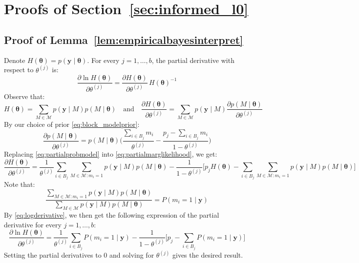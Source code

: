 \documentclass[aos]{imsart}
\theoremstyle{plain}
\newcommand{\M}{\mathcal{M}}
\newcommand{\bs}{\boldsymbol}
\begin{document}
\section{Proofs of Section~\ref{sec:informed_l0}}

\subsection{Proof of Lemma~\ref{lem:empiricalbayesinterpret}}
Denote $H(\bs \theta)=p(\bs y \mid \bs \theta)$. For every $j=1,\ldots,b$, the partial derivative with respect to $\theta^{(j)}$ is:
    \begin{equation}\label{eq:logderivative}
        \frac{\partial \ln H(\bs \theta)}{\partial \theta^{(j)}}=\frac{\partial H(\bs \theta)}{\partial \theta^{(j)}}\,H(\boldsymbol{\theta})^{-1}
    \end{equation}
    Observe that:
    \begin{equation}\label{eq:partialmarglikelihood}
    H(\bs \theta)=\sum_{M \in \M}p(\bs y \mid M)p(M \mid \bs \theta)
    \quad \text{and}\quad 
    \frac{\partial H(\bs \theta)}{\partial \theta^{(j)}}=\sum_{M\in \M}p(\bs y \mid M)\frac{\partial p(M \mid \bs \theta)}{\partial \theta^{(j)}}
    \end{equation}
    By our choice of prior \eqref{eq:block_modelprior}:
    \begin{equation}\label{eq:partialprobmodel}
    \frac{\partial p(M \mid \bs \theta)}{\partial \theta^{(j)}}= p(M \mid \bs \theta) \bigg(\frac{\sum_{i\in B_j}m_i}{\theta^{(j)}}-\frac{p_j-\sum_{i\in B_j}m_i}{1-\theta^{(j)}} \bigg)        
    \end{equation}
    Replacing \eqref{eq:partialprobmodel} into \eqref{eq:partialmarglikelihood}, we get:
    \begin{equation*}\label{eq:partialmarglikelihood2}
        \frac{\partial H(\bs \theta)}{\partial \theta^{(j)}}=\frac{1}{\theta^{(j)}}\sum_{i \in B_j}\sum_{M\in \M: m_i=1}p(\bs y \mid M)p(M \mid \bs \theta) - \frac{1}{1-\theta^{(j)}}\bigg[p_j H(\bs \theta)-\sum_{i \in B_j}\sum_{M\in \M: m_i=1}p(\bs y \mid M)p(M \mid \bs \theta)
        \bigg]
    \end{equation*}
    Note that:
    $$\frac{\sum_{M\in \M: m_i=1}p(\bs y \mid M)p(M \mid \bs \theta)}{\sum_{M\in \M}p(\bs y \mid M)p(M \mid \bs \theta)} = P(m_i = 1\mid \bs y)$$
    By \eqref{eq:logderivative}, we then get the following expression of the partial derivative for every $j=1,\ldots,b$:
    $$\frac{\partial \ln H(\bs \theta)}{\partial \theta^{(j)}}=\frac{1}{\theta^{(j)}}\sum_{i \in B_j}P(m_i = 1\mid \bs y) - \frac{1}{1-\theta^{(j)}}\bigg[p_j-\sum_{i \in B_j}P(m_i = 1\mid \bs y)
        \bigg]$$
    Setting the partial derivatives to 0 and solving for $\theta^{(j)}$ gives the desired result.
\end{document}
